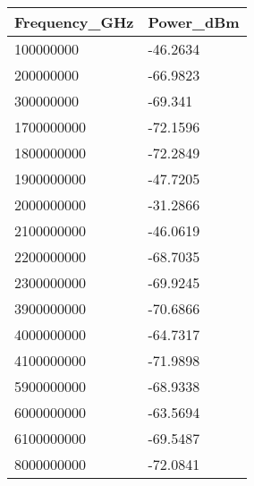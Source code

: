 \begin{tabular}{ll}
Frequency_GHz & Power_dBm \\ 
\hline 
100000000 & -46.2634 \\ 
200000000 & -66.9823 \\ 
300000000 & -69.341 \\ 
1700000000 & -72.1596 \\ 
1800000000 & -72.2849 \\ 
1900000000 & -47.7205 \\ 
2000000000 & -31.2866 \\ 
2100000000 & -46.0619 \\ 
2200000000 & -68.7035 \\ 
2300000000 & -69.9245 \\ 
3900000000 & -70.6866 \\ 
4000000000 & -64.7317 \\ 
4100000000 & -71.9898 \\ 
5900000000 & -68.9338 \\ 
6000000000 & -63.5694 \\ 
6100000000 & -69.5487 \\ 
8000000000 & -72.0841 \\ 
\hline 
\end{tabular}